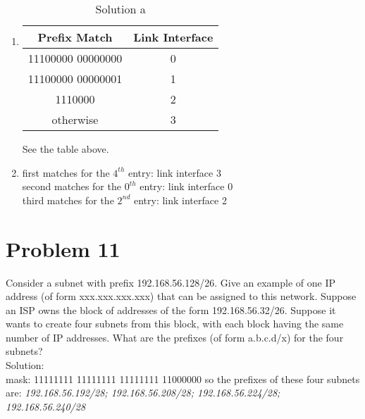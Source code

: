 \documentclass{article}
\begin{document}
\begin{enumerate} 
\item
\begin{table}[htbp]
  \centering
  \begin{tabular}{@{} cc @{}}
    \hline
    {\bfseries Prefix Match} & {\bfseries Link Interface} \\ 
    \hline
    11100000 00000000 & 0 \\ 
    11100000 00000001 & 1 \\ 
    1110000 & 2 \\ 
    otherwise & 3 \\ 
    \hline
    \hline
  \end{tabular}
  \caption{Solution a}
  \label{tab:label}
\end{table}

See the table above.\\

\item
first matches for the $4^{th}$ entry: link interface 3\\
second matches for the $0^{th}$ entry: link interface 0\\
third matches for the $2^{nd}$ entry: link interface 2\\

\end{enumerate}



\newpage
\section{Problem 11} Consider a subnet with prefix 192.168.56.128/26. Give an example of one IP address (of form xxx.xxx.xxx.xxx) that can be assigned to this network. Suppose an ISP owns the block of addresses of the form 192.168.56.32/26. Suppose it wants to create four subnets from this block, with each block having the same number of IP addresses. What are the prefixes (of form a.b.c.d/x) for the four subnets?\\
 

\noindent Solution:\\
mask: 11111111 11111111 11111111 11000000
so the prefixes of these four subnets are: \emph{192.168.56.192/28; 192.168.56.208/28; 192.168.56.224/28; 192.168.56.240/28}
\end{document}
